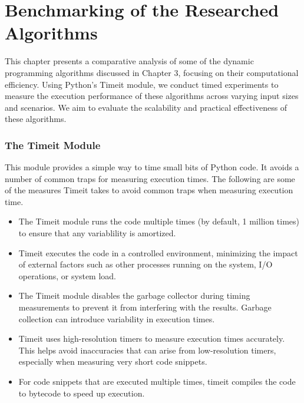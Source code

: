 \chapter{Benchmarking of the Researched Algorithms}
This chapter presents a comparative analysis of some of the dynamic programming algorithms discussed in Chapter 3,
focusing on their computational efficiency.
Using Python's Timeit module,
we conduct timed experiments to measure the execution performance of these algorithms across varying input sizes and scenarios.
We aim to evaluate the scalability and practical effectiveness of these algorithms.

\subsection*{The Timeit Module}
This module provides a simple way to time small bits of Python code.
It avoids a number of common traps for measuring execution times.
The following are some of the measures Timeit takes to avoid common traps when measuring execution time.
\begin{itemize}
    \item The Timeit module runs the code multiple times (by default, 1 million times) to ensure that any variablility is amortized.

    \item Timeit executes the code in a controlled environment, minimizing the impact of external factors such as other processes running on the system, I/O operations, or system load.

    \item The Timeit module disables the garbage collector during timing measurements to prevent it from interfering with the results. Garbage collection can introduce variability in execution times.

    \item Timeit uses high-resolution timers to measure execution times accurately. This helps avoid inaccuracies that can arise from low-resolution timers, especially when measuring very short code snippets.

    \item For code snippets that are executed multiple times, timeit compiles the code to bytecode to speed up execution.
\end{itemize}

